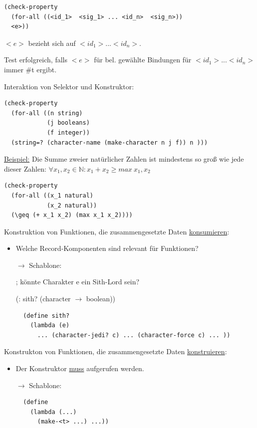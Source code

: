 \documentclass[a4paper, 20pt, openany]{book}
\begin{document}
\begin{lstlisting}
(check-property
  (for-all ((<id_1>  <sig_1> ... <id_n>  <sig_n>))
  <e>))
\end{lstlisting}
$<e>$ bezieht sich auf $<id_1>... <id_n>$.

Test erfolgreich, falls $<e>$ für bel. gewählte Bindungen für $<id_1>...<id_n>$ immer \#t ergibt.

Interaktion von Selektor und Konstruktor:

\begin{lstlisting}
(check-property  
  (for-all ((n string)
            (j booleans)
            (f integer))
  (string=? (character-name (make-character n j f)) n )))
\end{lstlisting}

\underline{Beispiel:} Die Summe zweier natürlicher Zahlen ist mindestens so groß wie jede dieser Zahlen: $\forall x_1, x_2 \in \mathbb{N} : x_1 + x_2 \geq max \ {x_1, x_2}$

\begin{lstlisting}
(check-property
  (for-all ((x_1 natural)
            (x_2 natural))
  (\geq (+ x_1 x_2) (max x_1 x_2))))
\end{lstlisting}

Konstruktion von Funktionen, die zusammengesetzte Daten \underline{konsumieren}:

\begin{itemize}
  \item Welche Record-Komponenten sind relevant für Funktionen?
  
  $\rightarrow$ Schablone:
  
  ; könnte Charakter e ein Sith-Lord sein?
  
  (: sith? (character $\rightarrow$ boolean))
  
  \begin{lstlisting}
  (define sith?
    (lambda (e) 
      ... (character-jedi? c) ... (character-force c) ... ))
  \end{lstlisting}
\end{itemize}

Konstrukton von Funktionen, die zusammengesetzte Daten \underline{konstruieren}: 

\begin{itemize}
  \item Der Konstruktor \underline{muss} aufgerufen werden.
  
  $\rightarrow$ Schablone:
  
  \begin{lstlisting}
  (define    
    (lambda (...)
      (make-<t> ...) ...))
  \end{lstlisting}

\end{itemize}
\end{document}

